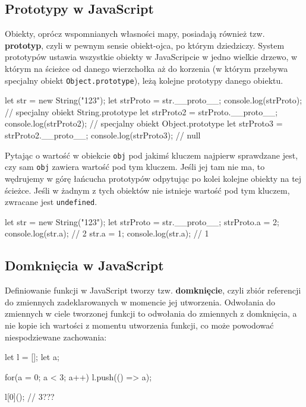 \subsection{Prototypy w JavaScript}

Obiekty, oprócz wspomnianych własności mapy, posiadają również tzw. \textbf{prototyp}, czyli w pewnym sensie obiekt-ojca, po którym dziedziczy. System prototypów ustawia wszystkie obiekty w JavaScripcie w jedno wielkie drzewo, w którym na ścieżce od danego wierzchołka aż do korzenia (w którym przebywa specjalny obiekt \texttt{Object.prototype}), leżą kolejne prototypy danego obiektu.
\begin{js}
    let str = new String("123");
    let strProto = str.__proto__;
    console.log(strProto); // specjalny obiekt String.prototype
    let strProto2 = strProto.__proto__;
    console.log(strProto2); // specjalny obiekt Object.prototype
    let strProto3 = strProto2.__proto__;
    console.log(strProto3); // null
\end{js}

Pytając o wartość w obiekcie \texttt{obj} pod jakimś kluczem najpierw sprawdzane jest, czy sam \texttt{obj} zawiera wartość pod tym kluczem. Jeśli jej tam nie ma, to wędrujemy w górę łańcucha prototypów odpytując po kolei kolejne obiekty na tej ścieżce. Jeśli w żadnym z tych obiektów nie istnieje wartość pod tym kluczem, zwracane jest \texttt{undefined}.
\begin{js}
    let str = new String("123");
    let strProto = str.__proto__;
    strProto.a = 2;
    console.log(str.a); // 2
    str.a = 1;
    console.log(str.a); // 1
\end{js}

\subsection{Domknięcia w JavaScript}
Definiowanie funkcji w JavaScript tworzy tzw. \textbf{domknięcie}, czyli zbiór referencji do zmiennych zadeklarowanych w momencie jej utworzenia. Odwołania do zmiennych w ciele tworzonej funkcji to odwołania do zmiennych z domknięcia, a nie kopie ich wartości z momentu utworzenia funkcji, co może powodować niespodziewane zachowania:
\begin{js}
    let l = [];
    let a;
    
    for(a = 0; a < 3; a++) {
        l.push(() => a);
    }
    
    l[0](); // 3???
\end{js}

